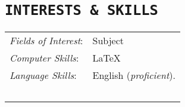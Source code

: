 \documentclass{cls/Curriculum_Vitae_Class}
\begin{document}

\section{\texttt{INTERESTS \& SKILLS}}
\begin{tabular}{ l l }
 \textit{Fields of Interest}: & Subject \\ [0.5em]
 \textit{Computer Skills}: & \LaTeX \\ [0.5em]
 \textit{Language Skills}: & English (\textit{proficient}).\\~\\
\end{tabular}


\end{document}
